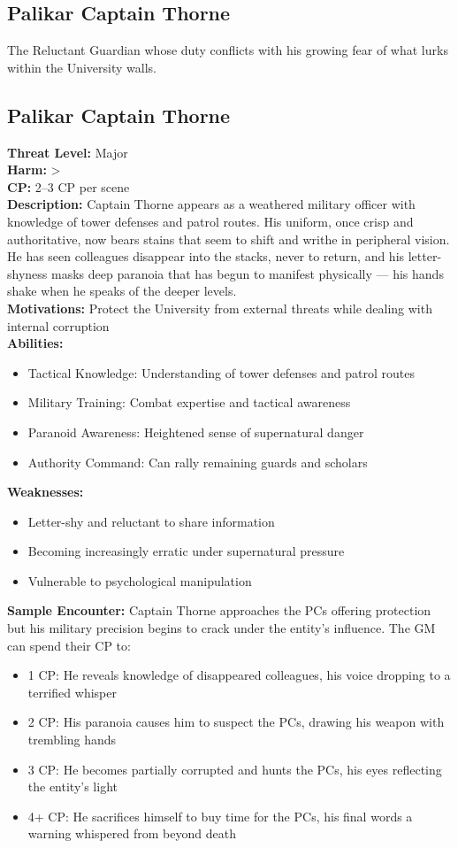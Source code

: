 \documentclass[11pt]{article}
\newenvironment{monsterentry}[1]{%
  \begin{mdframed}[backgroundcolor=shadecolor, linewidth=0pt, leftmargin=0pt, rightmargin=0pt]%
  \subsection*{#1}%
}{%
  \end{mdframed}%
}
\begin{document}
\subsection{Palikar Captain Thorne}

The Reluctant Guardian whose duty conflicts with his growing fear of what lurks within the University walls.

\begin{monsterentry}{Palikar Captain Thorne}
\textbf{Threat Level:} Major \\
\textbf{Harm:} \textgreater \\
\textbf{CP:} 2–3 CP per scene \\
\textbf{Description:} Captain Thorne appears as a weathered military officer with knowledge of tower defenses and patrol routes. His uniform, once crisp and authoritative, now bears stains that seem to shift and writhe in peripheral vision. He has seen colleagues disappear into the stacks, never to return, and his letter-shyness masks deep paranoia that has begun to manifest physically — his hands shake when he speaks of the deeper levels. \\
\textbf{Motivations:} Protect the University from external threats while dealing with internal corruption \\
\textbf{Abilities:}
\begin{itemize}
    \item Tactical Knowledge: Understanding of tower defenses and patrol routes
    \item Military Training: Combat expertise and tactical awareness
    \item Paranoid Awareness: Heightened sense of supernatural danger
    \item Authority Command: Can rally remaining guards and scholars
\end{itemize}
\textbf{Weaknesses:}
\begin{itemize}
    \item Letter-shy and reluctant to share information
    \item Becoming increasingly erratic under supernatural pressure
    \item Vulnerable to psychological manipulation
\end{itemize}
\textbf{Sample Encounter:} Captain Thorne approaches the PCs offering protection but his military precision begins to crack under the entity's influence. The GM can spend their CP to:
\begin{itemize}
    \item 1 CP: He reveals knowledge of disappeared colleagues, his voice dropping to a terrified whisper
    \item 2 CP: His paranoia causes him to suspect the PCs, drawing his weapon with trembling hands
    \item 3 CP: He becomes partially corrupted and hunts the PCs, his eyes reflecting the entity's light
    \item 4+ CP: He sacrifices himself to buy time for the PCs, his final words a warning whispered from beyond death
\end{itemize}
\end{monsterentry}
\end{document}

